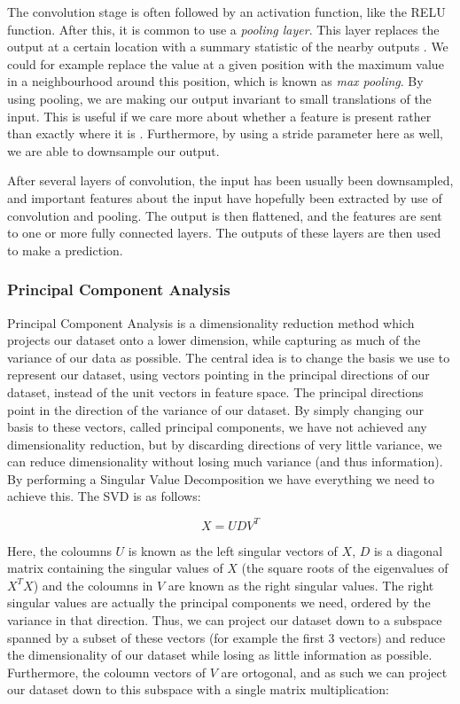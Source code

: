 \documentclass[onecolumn,10pt,cleanfoot]{asme2ej}
\begin{document}
The convolution stage is often followed by an activation function, like the RELU function. After this, it is common to use a {\it pooling layer}. This layer replaces the output at a certain location with a summary statistic of the nearby outputs \cite[335]{gbc}. We could for example replace the value at a given position with the maximum value in a neighbourhood around this position, which is known as {\it max pooling}. By using pooling, we are making our output invariant to small translations of the input. This is useful if we care more about whether a feature is present rather than exactly where it is \cite[336]{gbc}. Furthermore, by using a stride parameter here as well, we are able to downsample our output.

After several layers of convolution, the input has been usually been downsampled, and important features about the input have hopefully been extracted by use of convolution and pooling. The output is then flattened, and the features are sent to one or more fully connected layers. The outputs of these layers are then used to make a prediction.


\subsubsection{Principal Component Analysis}

Principal Component Analysis is a dimensionality reduction method which projects our dataset onto a lower dimension, while capturing as much of the variance of our data as possible. The central idea is to change the basis we use to represent our dataset, using vectors pointing in the principal directions of our dataset, instead of the unit vectors in feature space. The principal directions point in the direction of the variance of our dataset. By simply changing our basis to these vectors, called principal components, we have not achieved any dimensionality reduction, but by discarding directions of very little variance, we can reduce dimensionality without losing much variance (and thus information). By performing a Singular Value Decomposition we have everything we need to achieve this. The SVD is as follows:

\begin{equation}
X = UDV^T
\end{equation}

Here, the coloumns $U$ is known as the left singular vectors of $X$, $D$ is a diagonal matrix containing the singular values of $X$ (the square roots of the eigenvalues of $X^TX$) and the coloumns in $V$ are known as the right singular values. The right singular values are actually the principal components we need, ordered by the variance in that direction. Thus, we can project our dataset down to a subspace spanned by a subset of these vectors (for example the first 3 vectors) and reduce the dimensionality of our dataset while losing as little information as possible. Furthermore, the coloumn vectors of $V$ are ortogonal, and as such we can project our dataset down to this subspace with a single matrix multiplication:
\end{document}
